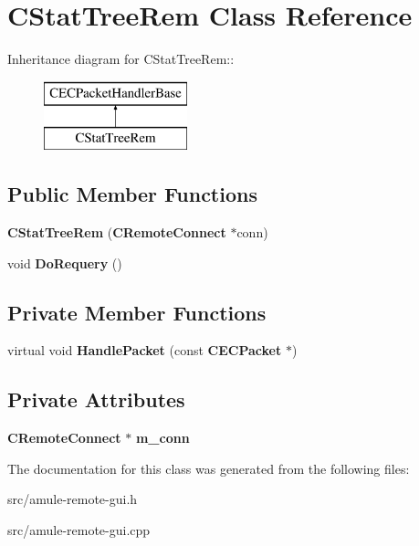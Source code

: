 \section{CStatTreeRem Class Reference}
\label{classCStatTreeRem}
Inheritance diagram for CStatTreeRem::\begin{figure}[H]
\begin{center}
\leavevmode
\includegraphics[height=2cm]{classCStatTreeRem}
\end{center}
\end{figure}
\subsection*{Public Member Functions}
\begin{DoxyCompactItemize}
\item 
{\bfseries CStatTreeRem} ({\bf CRemoteConnect} $\ast$conn)\label{classCStatTreeRem_ac0bedad41f516283fc332921a5579c46}

\item 
void {\bfseries DoRequery} ()\label{classCStatTreeRem_ad3c7dc3b21154ffa0b0f6ec0184faf37}

\end{DoxyCompactItemize}
\subsection*{Private Member Functions}
\begin{DoxyCompactItemize}
\item 
virtual void {\bfseries HandlePacket} (const {\bf CECPacket} $\ast$)\label{classCStatTreeRem_afc39128e022ae07fc265b1710adc50ae}

\end{DoxyCompactItemize}
\subsection*{Private Attributes}
\begin{DoxyCompactItemize}
\item 
{\bf CRemoteConnect} $\ast$ {\bfseries m\_\-conn}\label{classCStatTreeRem_a0b5ab51e160ba45c97642f595d9fa8fe}

\end{DoxyCompactItemize}


The documentation for this class was generated from the following files:\begin{DoxyCompactItemize}
\item 
src/amule-\/remote-\/gui.h\item 
src/amule-\/remote-\/gui.cpp\end{DoxyCompactItemize}
